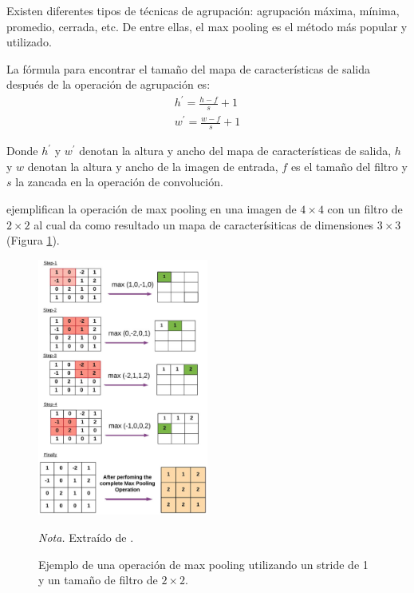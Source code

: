 Existen diferentes tipos de técnicas de agrupación: agrupación máxima, mínima, promedio, cerrada, etc. De entre ellas, el max pooling es el método 
más popular y utilizado.

La fórmula para encontrar el tamaño del mapa de características de salida después de la operación de agrupación es:
\begin{subequations}
    \begin{gather}
        h^{'} = \frac{h - f}{s} + 1 \\
        w^{'} = \frac{w - f}{s} + 1
        \label{eq:pooling_size}
    \end{gather}
\end{subequations}

Donde $h^{'}$ y $w^{'}$ denotan la altura y ancho del mapa de características de salida, $h$  y $w$ denotan la altura y ancho de la imagen de entrada, 
$f$ es el tamaño del filtro y $s$ la zancada en la operación de convolución.

\citet{balas_recent_2020} ejemplifican la operación de max pooling en una imagen de $4\times4$ con un filtro de $2\times2$ al cual 
da como resultado un mapa de caracterísiticas de dimensiones $3\times3$ (Figura \ref{fig:max_pooling}). 
\begin{figure}[H]
    \centering
    \caption{Ejemplo de una operación de max pooling utilizando un stride de 1 y un tamaño de filtro de $2\times2$.}
    \includegraphics[width=0.5\textwidth]{img/4_marco_teorico/max_pooling.png}
    \label{fig:max_pooling}
    \begin{flushleft}
        \textit{Nota.} Extraído de \citet{balas_recent_2020}. 
        \vspace{-\baselineskip}       
    \end{flushleft}  
\end{figure}

